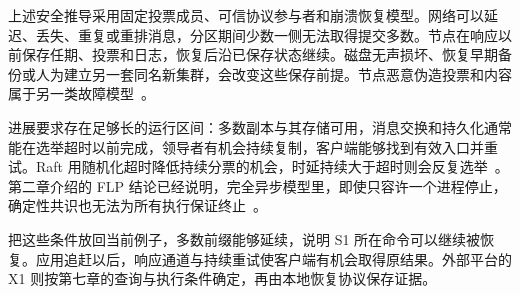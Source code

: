 上述安全推导采用固定投票成员、可信协议参与者和崩溃恢复模型。网络可以延迟、丢失、重复或重排消息，分区期间少数一侧无法取得提交多数。节点在响应以前保存任期、投票和日志，恢复后沿已保存状态继续。磁盘无声损坏、恢复早期备份或人为建立另一套同名新集群，会改变这些保存前提。节点恶意伪造投票和内容属于另一类故障模型~\cite{raft,paxos-made-simple}。

进展要求存在足够长的运行区间：多数副本与其存储可用，消息交换和持久化通常能在选举超时以前完成，领导者有机会持续复制，客户端能够找到有效入口并重试。Raft 用随机化超时降低持续分票的机会，时延持续大于超时则会反复选举~\cite{raft}。第二章介绍的 FLP 结论已经说明，完全异步模型里，即使只容许一个进程停止，确定性共识也无法为所有执行保证终止~\cite{flp}。


把这些条件放回当前例子，多数前缀能够延续，说明 S1 所在命令可以继续被恢复。应用追赶以后，响应通道与持续重试使客户端有机会取得原结果。外部平台的 X1 则按第七章的查询与执行条件确定，再由本地恢复协议保存证据。
\FloatBarrier
